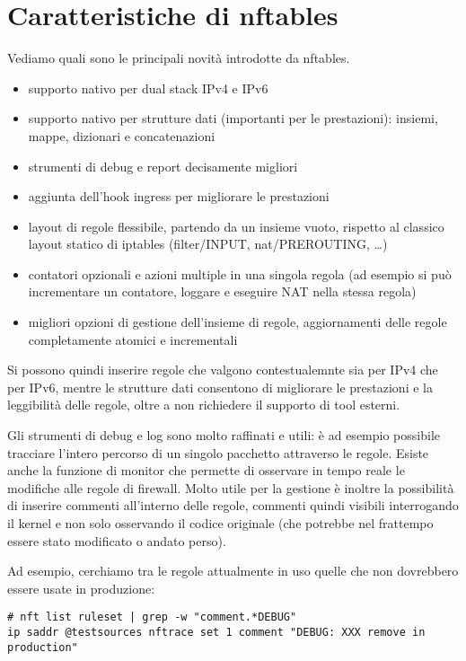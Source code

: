 \section{Caratteristiche di nftables}
Vediamo quali sono le principali novit\`a introdotte da nftables.
\begin{itemize}
    \item supporto nativo per dual stack IPv4 e IPv6
    \item supporto nativo per strutture dati (importanti per le prestazioni):
    insiemi, mappe, dizionari e concatenazioni
    \item strumenti di debug e report decisamente migliori
    \item aggiunta dell'hook ingress per migliorare le prestazioni
    \item layout di regole flessibile, partendo da un insieme vuoto, rispetto
    al classico layout statico di iptables (filter/INPUT, nat/PREROUTING,
    \ldots)
    \item contatori opzionali e azioni multiple in una singola regola (ad
    esempio si pu\`o incrementare un contatore, loggare e eseguire NAT nella
    stessa regola)
    \item migliori opzioni di gestione dell'insieme di regole, aggiornamenti
    delle regole completamente atomici e incrementali
\end{itemize}
Si possono quindi inserire regole che valgono contestualemnte sia per IPv4 che
per IPv6,
mentre le strutture dati consentono di migliorare le prestazioni e la
leggibilit\`a delle regole, oltre a non richiedere il supporto di tool
esterni.

Gli strumenti di debug e log sono molto raffinati e utili: \`e ad
esempio possibile tracciare l'intero percorso di un singolo pacchetto
attraverso le regole.  Esiste anche la funzione di monitor che permette di
osservare in tempo reale le modifiche alle regole di firewall.
Molto utile per la gestione è inoltre la possibilità di inserire commenti
all'interno delle regole, commenti quindi visibili interrogando il kernel e non
solo osservando il codice originale (che potrebbe nel frattempo essere stato 
modificato o andato perso).

Ad esempio, cerchiamo tra le regole attualmente in uso quelle che non
dovrebbero essere usate in produzione:
\begin{lstlisting}
# nft list ruleset | grep -w "comment.*DEBUG"
ip saddr @testsources nftrace set 1 comment "DEBUG: XXX remove in production"
\end{lstlisting}


